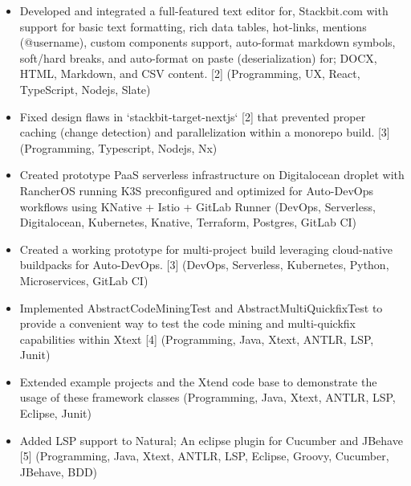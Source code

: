 \pagebreak

\begin{itemize}
  \item Developed and integrated a full-featured text editor for, Stackbit.com with support for basic text formatting, rich data tables, hot-links, mentions (@username), custom components support, auto-format markdown symbols, soft/hard breaks, and auto-format on paste (deserialization) for; DOCX, HTML, Markdown, and CSV content. [2] {\tiny (Programming, UX, React, TypeScript, Nodejs, Slate)}
  \item Fixed design flaws in `stackbit-target-nextjs` [2] that prevented proper caching (change detection) and parallelization within a monorepo build. [3] {\tiny (Programming, Typescript, Nodejs, Nx)}
\end{itemize}

\begin{itemize}
  \item Created prototype PaaS serverless infrastructure on Digitalocean droplet with RancherOS running K3S preconfigured and optimized for Auto-DevOps workflows using KNative + Istio + GitLab Runner {\tiny (DevOps, Serverless, Digitalocean, Kubernetes, Knative, Terraform, Postgres, GitLab CI)}
  \item Created a working prototype for multi-project build leveraging cloud-native buildpacks for Auto-DevOps. [3] {\tiny (DevOps, Serverless, Kubernetes, Python, Microservices, GitLab CI)}
\end{itemize}

\begin{itemize}
  \item Implemented AbstractCodeMiningTest and AbstractMultiQuickfixTest to provide a convenient way to test the code mining and multi-quickfix capabilities within Xtext [4] {\tiny (Programming, Java, Xtext, ANTLR, LSP, Junit)}
  \item Extended example projects and the Xtend code base to demonstrate the usage of these framework classes {\tiny (Programming, Java, Xtext, ANTLR, LSP, Eclipse, Junit)}
\end{itemize}

\begin{itemize}
  \item Added LSP support to Natural; An eclipse plugin for Cucumber and JBehave [5] {\tiny (Programming, Java, Xtext, ANTLR, LSP, Eclipse, Groovy, Cucumber, JBehave, BDD)}
\end{itemize}

